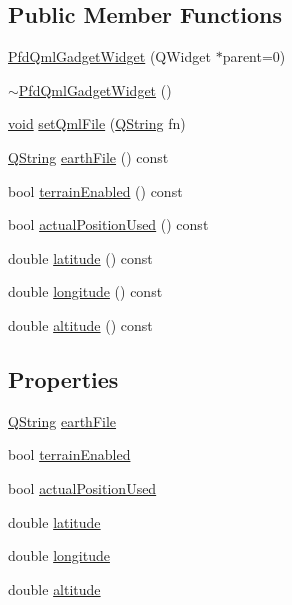 \subsection*{\-Public \-Member \-Functions}
\begin{DoxyCompactItemize}
\item 
\hyperlink{class_pfd_qml_gadget_widget_a9fbc21128f0cc8099fad2fa39ad3712e}{\-Pfd\-Qml\-Gadget\-Widget} (\-Q\-Widget $\ast$parent=0)
\item 
\hyperlink{class_pfd_qml_gadget_widget_a02e8beb8b84aa1aaf39e24a92d3b09b7}{$\sim$\-Pfd\-Qml\-Gadget\-Widget} ()
\item 
\hyperlink{group___u_a_v_objects_plugin_ga444cf2ff3f0ecbe028adce838d373f5c}{void} \hyperlink{class_pfd_qml_gadget_widget_ab7df16298baf43631c32dace9a1dffbf}{set\-Qml\-File} (\hyperlink{group___u_a_v_objects_plugin_gab9d252f49c333c94a72f97ce3105a32d}{\-Q\-String} fn)
\item 
\hyperlink{group___u_a_v_objects_plugin_gab9d252f49c333c94a72f97ce3105a32d}{\-Q\-String} \hyperlink{class_pfd_qml_gadget_widget_a6d1fc72b08f98e19caf6dcb41feca575}{earth\-File} () const 
\item 
bool \hyperlink{class_pfd_qml_gadget_widget_a20320a3d382fa1a594e6d685cdae6700}{terrain\-Enabled} () const 
\item 
bool \hyperlink{class_pfd_qml_gadget_widget_a576212ceaba3e38f5084c63fd4adaeaf}{actual\-Position\-Used} () const 
\item 
double \hyperlink{class_pfd_qml_gadget_widget_ab5b046fc7a3d9a5a9e04e997acf6edb9}{latitude} () const 
\item 
double \hyperlink{class_pfd_qml_gadget_widget_abb30ff6d422760314ff8791ad251d6bf}{longitude} () const 
\item 
double \hyperlink{class_pfd_qml_gadget_widget_a65914c682e36cf5c42c97f64b3f08b87}{altitude} () const 
\end{DoxyCompactItemize}
\subsection*{\-Properties}
\begin{DoxyCompactItemize}
\item 
\hyperlink{group___u_a_v_objects_plugin_gab9d252f49c333c94a72f97ce3105a32d}{\-Q\-String} \hyperlink{class_pfd_qml_gadget_widget_adc9e7df9c144b68f563c6e72c2cabff7}{earth\-File}
\item 
bool \hyperlink{class_pfd_qml_gadget_widget_afee0f7d6409cb17f5c6ea25b873630e0}{terrain\-Enabled}
\item 
bool \hyperlink{class_pfd_qml_gadget_widget_a15d0bedd6fb1a7865b3ef2af0fdf303c}{actual\-Position\-Used}
\item 
double \hyperlink{class_pfd_qml_gadget_widget_a72c9413b6d8fcd5901d69e41ab87e77a}{latitude}
\item 
double \hyperlink{class_pfd_qml_gadget_widget_a37f3fe5251a59848388a2032bf09e5ce}{longitude}
\item 
double \hyperlink{class_pfd_qml_gadget_widget_a1ec3b0cfb482e75513c5beb4a016292d}{altitude}
\end{DoxyCompactItemize}


